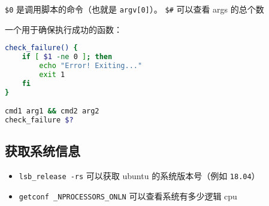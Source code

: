 \verb`$0` 是调用脚本的命令（也就是 \verb`argv[0]`）。 \verb`$#` 可以查看 args 的总个数

一个用于确保执行成功的函数：
\begin{lstlisting}[language=bash]
check_failure() {
    if [ $1 -ne 0 ]; then
        echo "Error! Exiting..."
        exit 1
    fi
}

cmd1 arg1 && cmd2 arg2
check_failure $?
\end{lstlisting}

\subsection{获取系统信息}
\begin{itemize}
\item \verb`lsb_release -rs` 可以获取 ubuntu 的系统版本号（例如 \verb`18.04`）
\item \verb`getconf _NPROCESSORS_ONLN` 可以查看系统有多少逻辑 cpu
\end{itemize}
